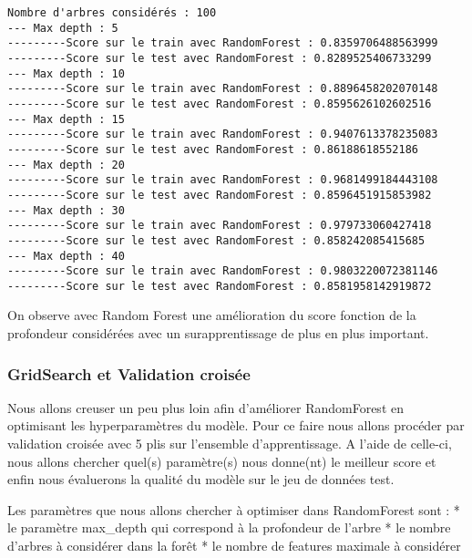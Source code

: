 \documentclass[11pt]{article}
\begin{document}
    \begin{Verbatim}[commandchars=\\\{\}]
Nombre d'arbres considérés : 100
--- Max depth : 5
---------Score sur le train avec RandomForest : 0.8359706488563999
---------Score sur le test avec RandomForest : 0.8289525406733299
--- Max depth : 10
---------Score sur le train avec RandomForest : 0.8896458202070148
---------Score sur le test avec RandomForest : 0.8595626102602516
--- Max depth : 15
---------Score sur le train avec RandomForest : 0.9407613378235083
---------Score sur le test avec RandomForest : 0.86188618552186
--- Max depth : 20
---------Score sur le train avec RandomForest : 0.9681499184443108
---------Score sur le test avec RandomForest : 0.8596451915853982
--- Max depth : 30
---------Score sur le train avec RandomForest : 0.979733060427418
---------Score sur le test avec RandomForest : 0.858242085415685
--- Max depth : 40
---------Score sur le train avec RandomForest : 0.9803220072381146
---------Score sur le test avec RandomForest : 0.8581958142919872
    \end{Verbatim}

    On observe avec Random Forest une amélioration du score fonction de la
profondeur considérées avec un surapprentissage de plus en plus
important.

    \hypertarget{gridsearch-et-validation-croisuxe9e}{%
\subsubsection{GridSearch et Validation
croisée}\label{gridsearch-et-validation-croisuxe9e}}

Nous allons creuser un peu plus loin afin d'améliorer RandomForest en
optimisant les hyperparamètres du modèle. Pour ce faire nous allons
procéder par validation croisée avec 5 plis sur l'ensemble
d'apprentissage. A l'aide de celle-ci, nous allons chercher quel(s)
paramètre(s) nous donne(nt) le meilleur score et enfin nous évaluerons
la qualité du modèle sur le jeu de données test.

Les paramètres que nous allons chercher à optimiser dans RandomForest
sont : * le paramètre max\_depth qui correspond à la profondeur de
l'arbre * le nombre d'arbres à considérer dans la forêt * le nombre de
features maximale à considérer
\end{document}
